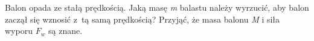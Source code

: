 Balon opada ze stałą prędkością. Jaką masę \emph{m} balastu należy wyrzucić, aby balon zaczął się wznosić z~tą samą prędkością? Przyjąć, że masa balonu \emph{M} i siła wyporu \emph{$F_w$} są znane.

